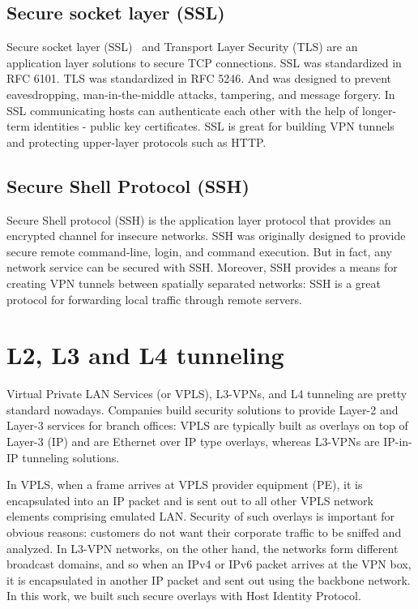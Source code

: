 \subsection{Secure socket layer (SSL)}
Secure socket layer (SSL)~\cite{ssl} and Transport Layer Security (TLS) are an application 
layer solutions to secure TCP connections. SSL was standardized in RFC 6101. 
TLS was standardized in RFC 5246. And was designed to prevent eavesdropping, 
man-in-the-middle attacks, tampering, and message forgery. In SSL communicating 
hosts can authenticate each other with the help of longer-term identities - public key certificates.
SSL is great for building VPN tunnels and protecting upper-layer protocols such as HTTP.


\subsection{Secure Shell Protocol (SSH)}

Secure Shell protocol (SSH) is the application layer protocol that provides an encrypted channel 
for insecure networks. SSH was originally designed to provide secure remote command-line, login, 
and command execution. But in fact, any network service can be secured with SSH. Moreover, SSH 
provides a means for creating VPN tunnels between spatially separated networks: SSH is a great 
protocol for forwarding local traffic through remote servers. 

\section{L2, L3 and L4 tunneling}

Virtual Private LAN Services (or VPLS), L3-VPNs, and L4 tunneling are pretty standard nowadays. 
Companies build security solutions to provide Layer-2 and Layer-3 services for branch offices: 
VPLS are typically built as overlays on top of Layer-3 (IP) and are Ethernet over IP type 
overlays, whereas L3-VPNs are IP-in-IP tunneling solutions.

In VPLS, when a frame arrives at VPLS provider equipment (PE), it is encapsulated 
into an IP packet and is sent out to all other VPLS network elements comprising emulated LAN. 
Security of such overlays is important for obvious reasons: customers do not want their corporate 
traffic to be sniffed and analyzed. In L3-VPN networks, on the other hand, the networks form different 
broadcast domains, and so when an IPv4 or IPv6 packet arrives at the VPN box, it is encapsulated in another 
IP packet and sent out using the backbone network. In this work, we built such secure overlays with 
Host Identity Protocol. 

